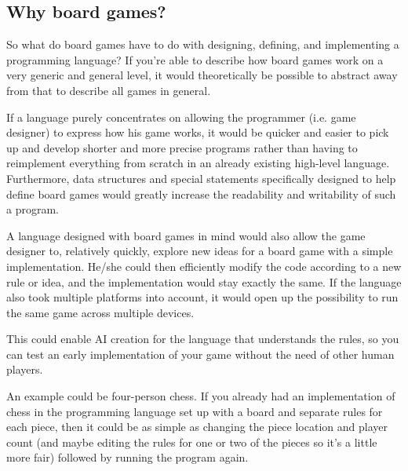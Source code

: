 \subsection{Why board games?}
\label{sec:whyboardgames}


So what do board games have to do with designing,
defining, and implementing a programming language?
If you're able to describe how board games work
on a very generic and general level, it would
theoretically be possible to abstract away from
that to describe all games in general.

If a language purely concentrates on allowing the
programmer (i.e. game designer) to express how his
game works, it would be quicker and easier to pick
up and develop shorter and more precise programs
rather than having to reimplement everything
from scratch in an already existing high-level
language. Furthermore, data structures and special
statements specifically designed to help define
board games would greatly increase the readability
and writability of such a program.

A language designed with board games in mind
would also allow the game designer to, relatively
quickly, explore new ideas for a board game
with a simple implementation. He/she could then
efficiently modify the code according to a new
rule or idea, and the implementation would stay
exactly the same. If the language also took
multiple platforms into account, it would open
up the possibility to run the same game across
multiple devices.

This could enable AI creation for the language
that understands the rules, so you can test an
early implementation of your game without the need
of other human players.

An example could be four-person chess. If you
already had an implementation of chess in the
programming language set up with a board and
separate rules for each piece, then it could be as
simple as changing the piece location and player
count (and maybe editing the rules for one or two
of the pieces so it's a little more fair) followed
by running the program again.

